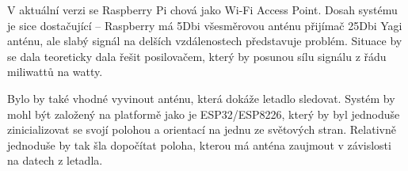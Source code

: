 \documentclass[a4paper,oneside,12pt]{report}
\let\openright=\clearpage
\begin{document}
V aktuální verzi se Raspberry Pi chová jako Wi-Fi Access Point.
Dosah systému je sice dostačující -- Raspberry má 5Dbi všesměrovou anténu přijímač 25Dbi Yagi anténu, ale slabý signál na delších vzdálenostech představuje problém.
Situace by se dala teoreticky dala řešit posilovačem, který by posunou sílu signálu z řádu miliwattů na watty.

Bylo by také vhodné vyvinout anténu, která dokáže letadlo sledovat.
Systém by mohl být založený na platformě jako je ESP32/ESP8226, který by byl jednoduše zinicializovat se svojí polohou a orientací na jednu ze světových stran.
Relativně jednoduše by tak šla dopočítat poloha, kterou má anténa zaujmout v závislosti na datech z letadla.

\chapter*{}
\setcounter{page}{5} %





\listoffigures
\openright
\end{document}
